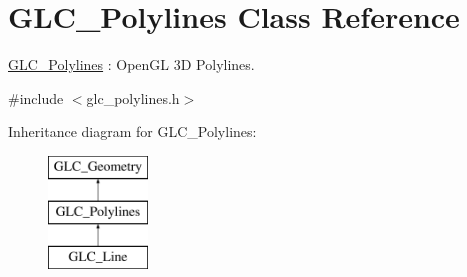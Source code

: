 \hypertarget{class_g_l_c___polylines}{\section{G\-L\-C\-\_\-\-Polylines Class Reference}
\label{class_g_l_c___polylines}
}


\hyperlink{class_g_l_c___polylines}{G\-L\-C\-\_\-\-Polylines} \-: Open\-G\-L 3\-D Polylines.  




{\ttfamily \#include $<$glc\-\_\-polylines.\-h$>$}

Inheritance diagram for G\-L\-C\-\_\-\-Polylines\-:\begin{figure}[H]
\begin{center}
\leavevmode
\includegraphics[height=3.000000cm]{class_g_l_c___polylines}
\end{center}
\end{figure}
